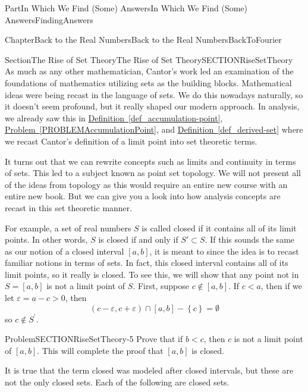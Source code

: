 \documentclass[oneside,10pt,]{book}
\newcommand{\xreffont}{\relax}
\numberwithin{equation}{part}
\newcommand{\eps}{\varepsilon}
\newcommand{\lt}{<}
\newcommand{\gt}{>}
\begin{document}
\begin{partptx}{Part}{In Which We Find (Some) Answers}{}{In Which We Find (Some) Answers}{}{}{FindingAnswers}
\begin{chapterptx}{Chapter}{Back to the Real Numbers}{}{Back to the Real Numbers}{}{}{BackToFourier}
\typeout{************************************************}
%
\begin{sectionptx}{Section}{The Rise of Set Theory}{}{The Rise of Set Theory}{}{}{SECTIONRiseSetTheory}
As much as any other mathematician, Cantor's work led an examination of the foundations of mathematics utilizing sets as the building blocks.  Mathematical ideas were being recast in the language of sets.  We do this nowadays naturally, so it doesn't seem profound, but it really shaped our modern approach. In analysis, we already saw this in \hyperref[def_accumulation-point]{Definition~{\xreffont\ref{def_accumulation-point}}}, \hyperref[PROBLEMAccumulationPoint]{Problem~{\xreffont\ref{PROBLEMAccumulationPoint}}}, and \hyperref[def_derived-set]{Definition~{\xreffont\ref{def_derived-set}}} where we recast Cantor's definition of a limit point into set theoretic terms.%
\par
It turns out that we can rewrite concepts such as limits and continuity in terms of sets.  This led to a subject known as point set topology.  We will not present all of the ideas from topology as this would require an entire new course with an entire new book.  But we can give you a look into how analysis concepts are recast in this set theoretic manner.%
\par
For example, a set of real numbers \(S\) is called closed if it contains all of its limit points.  In other words, \(S\) is closed if and only if \(S'\subset S.\) If this sounds the same as our notion of a closed interval \([a,b]\), it is meant to since the idea is to recast familiar notions in terms of sets.  In fact, this closed interval contains all of its limit points, so it really is closed.  To see this, we will show that any point not in \(S=[a,b]\) is not a limit point of \(S\).  First, suppose \(c\notin [a,b]\).  If \(c\lt a\), then if we let \(\eps =a-c\gt0\), then%
\begin{equation*}
\left(c-\eps
,c+\eps \right)\cap
\left[a,b\right]-\left\{c\right\}=\emptyset 
\end{equation*}
so \(c\notin S^\prime\).%
\begin{problem}{Problem}{}{SECTIONRiseSetTheory-5}%
Prove that if \(b\lt c\), then \(c\) is not a limit point of \([a,b]\).  This will complete the proof that \([a,b]\) is closed.%
\end{problem}
It is true that the term closed was modeled after closed intervals, but these are not the only closed sets.  Each of the following are closed sets.%
\begin{multicols}{2}

\end{multicols}
\end{sectionptx}
\end{chapterptx}
\end{partptx}
\end{document}
